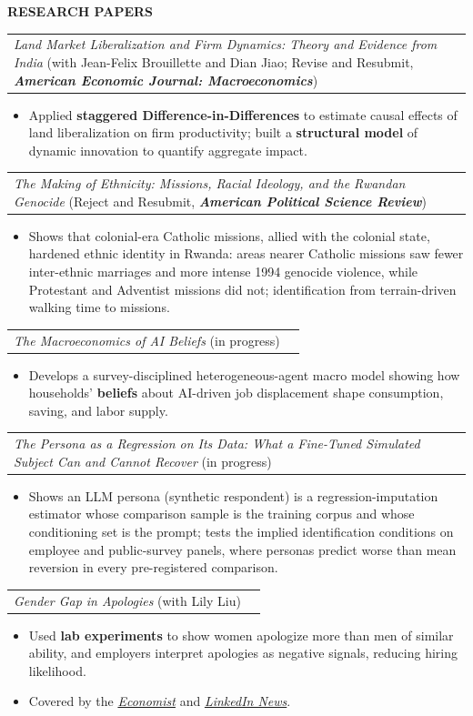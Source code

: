 \documentclass[10pt]{article}
\makeatletter
\newcommand{\entry}[2]{%
  \noindent\begin{tabularx}{\textwidth}{@{}X r@{}} #1 & #2 \end{tabularx}\par
}
\newcommand{\sect}[1]{\vspace{1.25em}\textbf{\large #1}\par\vspace{1.0em}}
\makeatother
\begin{document}
\sect{RESEARCH PAPERS}
\entry{\textit{Land Market Liberalization and Firm Dynamics: Theory and Evidence from India} \textnormal{(with Jean-Felix Brouillette and Dian Jiao; Revise and Resubmit, \textbf{\textit{American Economic Journal: Macroeconomics}})}}{}
\begin{itemize}
\small
    \item Applied \textbf{staggered Difference-in-Differences} to estimate causal effects of land liberalization on firm productivity; built a \textbf{structural model} of dynamic innovation to quantify aggregate impact.
\end{itemize}

\entry{\textit{The Making of Ethnicity: Missions, Racial Ideology, and the Rwandan Genocide} \textnormal{(Reject and Resubmit, \textbf{\textit{American Political Science Review}})}}{}
\begin{itemize}
\small
    \item Shows that colonial-era Catholic missions, allied with the colonial state, hardened ethnic identity in Rwanda: areas nearer Catholic missions saw fewer inter-ethnic marriages and more intense 1994 genocide violence, while Protestant and Adventist missions did not; identification from terrain-driven walking time to missions.
\end{itemize}

\entry{\textit{The Macroeconomics of AI Beliefs} \textnormal{(in progress)}}{}
\begin{itemize}
\small
    \item Develops a survey-disciplined heterogeneous-agent macro model showing how households' \textbf{beliefs} about AI-driven job displacement shape consumption, saving, and labor supply.
\end{itemize}

\entry{\textit{The Persona as a Regression on Its Data: What a Fine-Tuned Simulated Subject Can and Cannot Recover} \textnormal{(in progress)}}{}
\begin{itemize}
\small
    \item Shows an LLM persona (synthetic respondent) is a regression-imputation estimator whose comparison sample is the training corpus and whose conditioning set is the prompt; tests the implied identification conditions on employee and public-survey panels, where personas predict worse than mean reversion in every pre-registered comparison.
\end{itemize}

\entry{\textit{Gender Gap in Apologies} \textnormal{(with Lily Liu)}}{}
\begin{itemize}
\small
    \item Used \textbf{lab experiments} to show women apologize more than men of similar ability, and employers interpret apologies as negative signals, reducing hiring likelihood.
    \item Covered by the \href{https://www.economist.com/graphic-detail/2025/04/09/what-your-boss-makes-of-your-apology}{\textit{Economist}} and \href{https://www.linkedin.com/news/story/think-twice-before-apologising-7354914/?utm_source=rss&utm_campaign=storylines_en}{\textit{LinkedIn News}}.
\end{itemize}
\end{document}

